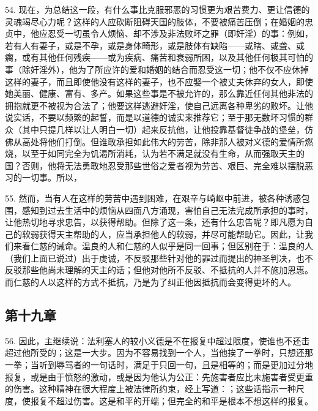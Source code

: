54. 现在，为总结这一段，有什么事比克服邪恶的习惯更为艰苦费力、更让信德的灵魂竭尽心力呢？这样的人应砍断阻碍天国的肢体，不要被痛苦压倒；在婚姻的忠贞中，他应忍受一切虽令人烦恼、却不涉及非法败坏之罪（即奸淫）的事：例如，若有人有妻子，或是不孕，或是身体畸形，或是肢体有缺陷——或瞎、或聋、或瘸，或有其他任何残疾——或为疾病、痛苦和衰弱所困，以及其他任何极其可怕的事（除奸淫外），他为了所应许的爱和婚姻的结合而忍受这一切；他不仅不应休掉这样的妻子，而且即使他没有这样的妻子，也不应娶一个被丈夫休弃的女人，即使她美丽、健康、富有、多产。如果这些事是不被允许的，那么靠近任何其他非法的拥抱就更不被视为合法了；他要这样逃避奸淫，使自己远离各种卑劣的败坏。让他说实话，不要以频繁的起誓，而是以道德的诚实来推荐它；至于那无数坏习惯的群众（其中只提几样以让人明白一切）起来反抗他，让他投靠基督徒争战的堡垒，仿佛从高处将他们打倒。但谁敢承担如此伟大的劳苦，除非那人被对义德的爱情所燃烧，以至于如同完全为饥渴所消耗，认为若不满足就没有生命，从而强取天主的国？否则，他将无法勇敢地忍受那些世俗之爱者视为劳苦、艰巨、完全难以摆脱恶习的一切事。所以，\par

55. 然而，当有人在这样的劳苦中遇到困难，在艰辛与崎岖中前进，被各种诱惑包围，感知到过去生活中的烦恼从四面八方涌现，害怕自己无法完成所承担的事时，让他热切地寻求忠告，以获得帮助。但除了这一条，还有什么忠告呢？即凡愿为自己的软弱获得天主帮助的人，应当承担他人的软弱，并尽可能帮助它。因此，让我们来看仁慈的诫命。温良的人和仁慈的人似乎是同一回事；但区别在于：温良的人（我们上面已说过）出于虔诚，不反驳那些针对他的罪过而提出的神圣判决，也不反驳那些他尚未理解的天主的话；但他对他所不反驳、不抵抗的人并不施加恩惠。而仁慈的人以这样的方式不抵抗，乃是为了纠正他因抵抗而会变得更坏的人。\par


\subsection{第十九章}

56. 因此，主继续说：法利塞人的较小义德是不在报复中超过限度，使谁也不还击超过他所受的；这是一大步。因为不容易找到一个人，当他挨了一拳时，只想还那一拳；当听到辱骂者的一句话时，满足于只回一句，且是相等的；而是更加过分地报复，或是由于愤怒的激动，或是因为他认为公正：先施害者应比未施害者受更重的伤害。这种精神在很大程度上被法律所约束，经上写道：；这些话指示一种尺度，使报复不超过伤害。这是和平的开端；但完全的和平是根本不想这样的报复。\par

